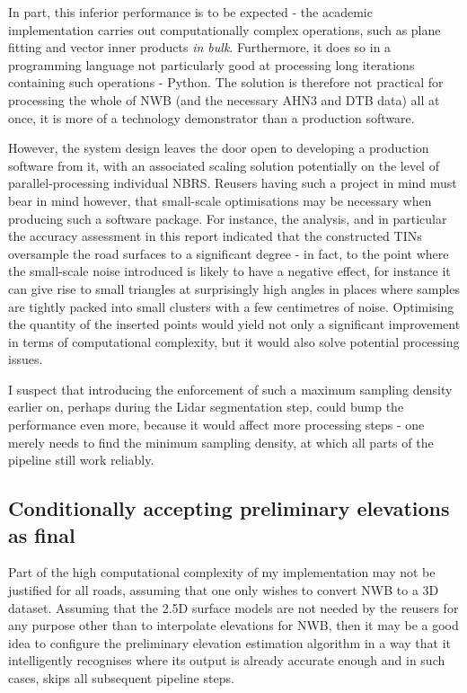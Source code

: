 In part, this inferior performance is to be expected - the academic implementation carries out computationally complex operations, such as plane fitting and vector inner products \textit{in bulk}. Furthermore, it does so in a programming language not particularly good at processing long iterations containing such operations - Python. The solution is therefore not practical for processing the whole of NWB (and the necessary AHN3 and DTB data) all at once, it is more of a technology demonstrator than a production software.

However, the system design leaves the door open to developing a production software from it, with an associated scaling solution potentially on the level of parallel-processing individual NBRS. Reusers having such a project in mind must bear in mind however, that small-scale optimisations may be necessary when producing such a software package. For instance, the analysis, and in particular the accuracy assessment in this report indicated that the constructed TINs oversample the road surfaces to a significant degree - in fact, to the point where the small-scale noise introduced is likely to have a negative effect, for instance it can give rise to small triangles at surprisingly high angles in places where samples are tightly packed into small clusters with a few centimetres of noise. Optimising the quantity of the inserted points would yield not only a significant improvement in terms of computational complexity, but it would also solve potential processing issues.

I suspect that introducing the enforcement of such a maximum sampling density earlier on, perhaps during the Lidar segmentation step, could bump the performance even more, because it would affect more processing steps - one merely needs to find the minimum sampling density, at which all parts of the pipeline still work reliably.

\subsection{Conditionally accepting preliminary elevations as final}
\label{sub:improvementssupportdataset}

Part of the high computational complexity of my implementation may not be justified for all roads, assuming that one only wishes to convert NWB to a 3D dataset. Assuming that the 2.5D surface models are not needed by the reusers for any purpose other than to interpolate elevations for NWB, then it may be a good idea to configure the preliminary elevation estimation algorithm in a way that it intelligently recognises where its output is already accurate enough and in such cases, skips all subsequent pipeline steps.

